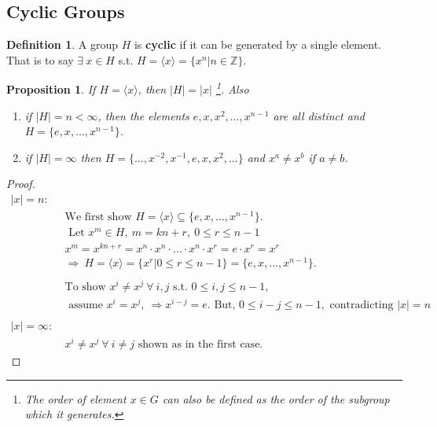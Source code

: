 \documentclass{article}
\newtheorem{theorem}{Proposition}[section]
\theoremstyle{definition}
\newtheorem{definition}{Definition}[section]
\theoremstyle{remark}
\begin{document}
\subsection{Cyclic Groups}
\begin{definition}
	A group $H$ is \textbf{cyclic} if it can be generated by a single element. That is to say $\exists~ x\in H$ s.t. $H=\langle x\rangle=\lbrace x^n|n\in \mathbb{Z}\rbrace$.\\
\end{definition}
\begin{theorem}
	If  $H=\langle x\rangle$, then $|H|=|x|$  \footnote{The order of element $x\in G$ can also be defined as the order of the subgroup which it generates.}. Also
	\begin{enumerate}
		\item if $|H|=n<\infty$, then the elements $e,x,x^2,...,x^{n-1}$ are all distinct and $H=\lbrace e,x,...,x^{n-1}\rbrace$.
		\item if $|H|=\infty$ then $H=\lbrace ...,x^{-2},x^{-1},e,x,x^2,...\rbrace$ and $x^a\neq x^b$ if $a\neq b$. \\
	\end{enumerate}
\end{theorem}
\begin{proof}
	\begin{align*}
		|x|=n:~      &                                                                                                             \\
		             & \text{We first show }H=\langle x \rangle\subseteq\lbrace e,x,...,x^{n-1}\rbrace.                            \\
		             & \text{ Let } x^m\in H,~m=kn+r, ~0\leq r\leq n-1                                                             \\
		             & x^m=x^{kn+r}=x^n\cdot x^n \cdot ... \cdot x^n \cdot x^r = e\cdot x^r=x^r                                    \\
		             & \Rightarrow ~ H=\langle x\rangle=\lbrace x^r|0\leq r\leq n-1\rbrace=\lbrace e,x,...,x^{n-1}\rbrace.         \\
		             & ~                                                                                                           \\
		             & \text{To show } x^i\neq x^j~\forall~i,j\text{ s.t. }0\leq i,j\leq n-1,                                      \\
		             & \text{ assume } x^i=x^j,~\Rightarrow x^{i-j}=e. \text{ But, }0\leq i-j\leq n-1,\text{ contradicting } |x|=n \\
		             & ~                                                                                                           \\
		|x|=\infty:~ &                                                                                                             \\
		             & x^i\neq x^j~\forall~ i\neq j\text{ shown as in the first case.}
	\end{align*}
\end{proof}
\end{document}
